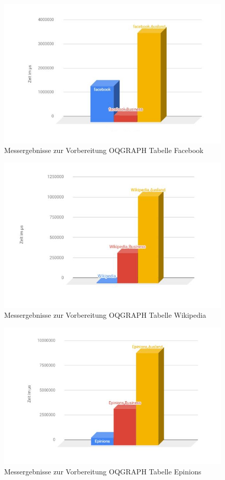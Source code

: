 \begin{figure}
	\centering
	\includegraphics[width=\textwidth]{images/facevor.jpg}
	\caption{Messergebnisse zur Vorbereitung OQGRAPH Tabelle Facebook}
	\label{fig:facevor}
\end{figure}

\begin{figure}
	\centering
	\includegraphics[width=\textwidth]{images/wikivor.jpg}
	\caption{Messergebnisse zur Vorbereitung OQGRAPH Tabelle Wikipedia}
	\label{fig:wikivor}
\end{figure}

\begin{figure}
	\centering
	\includegraphics[width=\textwidth]{images/epinvor.jpg}
	\caption{Messergebnisse zur Vorbereitung OQGRAPH Tabelle Epinions}
	\label{fig:epinvor}
\end{figure}

